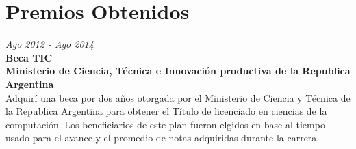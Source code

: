 \section{Premios Obtenidos}

\begin{large}
    \textit{Ago 2012 - Ago 2014}\\
    \textbf{Beca TIC}\\
    \textbf{Ministerio de Ciencia, Técnica e Innovación productiva de la Republica Argentina}\\
    Adquirí una beca por dos años otorgada por el Ministerio de Ciencia y Técnica de la Republica
   Argentina para obtener el Título de licenciado en ciencias de la computación. Los beneficiarios de
   este plan fueron elgidos en base al tiempo usado para el avance y el promedio de notas adquiridas
durante la carrera.
\end{large}

